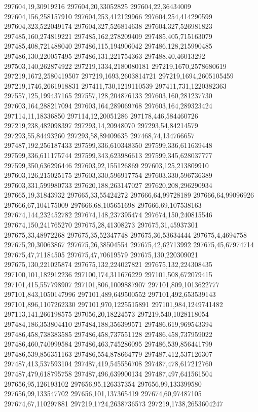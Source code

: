 297604,19,30919216
297604,20,33052825
297604,22,36434009
297604,156,258157910
297604,253,412129966
297604,254,414290599
297604,323,522049174
297604,327,526814638
297604,327,526981823
297485,160,274819221
297485,162,278209409
297485,405,715163079
297485,408,721488040
297486,115,194906042
297486,128,215990485
297486,130,220057495
297486,131,221754363
297488,40,46013292
297503,140,262874922
297219,1334,2180080181
297219,1670,2578680619
297219,1672,2580419507
297219,1693,2603814721
297219,1694,2605105459
297219,1746,2661918831
297411,730,1219110539
297411,731,1220382363
297557,125,199437165
297557,128,204876133
297603,160,281237730
297603,164,288217094
297603,164,289069768
297603,164,289323424
297114,11,18336850
297114,12,20051286
297178,446,584460726
297219,238,482098397
297293,14,20948070
297293,54,84214579
297293,55,84493260
297293,58,89409635
297468,74,134766657
297487,192,256187433
297599,336,610348350
297599,336,611639448
297599,336,611175744
297599,343,623986613
297599,345,628037777
297599,350,636296446
297603,92,155126869
297603,125,213809910
297603,126,215025175
297603,330,596917754
297603,330,596736389
297603,331,599980733
297620,188,263147027
297620,208,296290934
297665,19,31843932
297665,33,55424272
297666,64,99728189
297666,64,99096926
297666,67,104175009
297666,68,105651698
297666,69,107538163
297674,144,232452782
297674,148,237395474
297674,150,240815546
297674,150,241765270
297675,28,41308273
297675,31,45937301
297675,33,48972268
297675,35,52347748
297675,36,53634444
297675,4,4694758
297675,20,30063867
297675,26,38504554
297675,42,62713992
297675,45,67974714
297675,47,71184505
297675,47,70619579
297675,130,220309021
297675,130,221025874
297675,132,224027821
297675,132,224308435
297100,101,182912236
297100,174,311676229
297101,508,672079415
297101,415,557798907
297101,806,1009887907
297101,809,1013622777
297101,843,1050147996
297101,489,649500552
297101,492,653539143
297101,896,1107262330
297101,970,1225515891
297101,984,1249741482
297113,141,266198575
297056,20,18224573
297219,540,1028118054
297484,186,353804410
297484,188,356399571
297486,619,969543394
297486,458,738383585
297486,458,737551128
297486,458,737959022
297486,460,740999584
297486,463,745286095
297486,539,856441799
297486,539,856351163
297486,554,878664779
297487,412,537126307
297487,413,537593104
297487,419,545556708
297487,478,617212760
297487,479,618795758
297487,496,639900134
297487,497,641561504
297656,95,126193102
297656,95,126337354
297656,99,133399580
297656,99,133547702
297656,101,137365419
297674,60,97487105
297674,67,110297881
297219,1724,2638736573
297219,1738,2653604247
